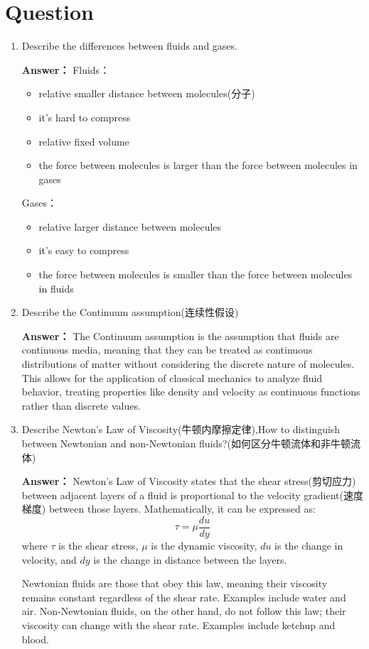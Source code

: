 \documentclass[12pt,a4paper]{article}
\newcounter{question}
\newenvironment{questions}{
    \setcounter{question}{0}
    \section*{Question}
    \begin{enumerate}[leftmargin=1.5em,label={\arabic*．}]
}{
    \end{enumerate}
}
\newcommand{\answer}[1]{\par\noindent\textbf{Answer：} #1\par\vspace{1em}}
\begin{document}
\begin{questions}
  \item Describe the differences between fluids and gases.
  \answer{
    Fluids：
    \begin{itemize}
      \item relative smaller distance between molecules(分子)
      \item it's hard to compress
      \item relative fixed volume
      \item the force between molecules is larger than the force between molecules in gases
    \end{itemize}

    Gases：
    \begin{itemize}
      \item relative larger distance between molecules
      \item it's easy to compress
      \item the force between molecules is smaller than the force between molecules in fluids
    \end{itemize}
  }

  \item Describe the Continuum assumption(连续性假设)
  
  \answer{
    The Continuum assumption is the assumption that fluids are continuous media, meaning that they can be treated as continuous distributions of matter without considering the discrete nature of molecules. This allows for the application of classical mechanics to analyze fluid behavior, treating properties like density and velocity as continuous functions rather than discrete values.
  }

  \item Describe Newton's Law of Viscosity(牛顿内摩擦定律),How to distinguish between Newtonian and non-Newtonian fluids?(如何区分牛顿流体和非牛顿流体)
  
  \answer{
    Newton's Law of Viscosity states that the shear stress(剪切应力) between adjacent layers of a fluid is proportional to the velocity gradient(速度梯度) between those layers. Mathematically, it can be expressed as:
    \[
    \tau = \mu \frac{du}{dy}
    \]
    where $\tau$ is the shear stress, $\mu$ is the dynamic viscosity, $du$ is the change in velocity, and $dy$ is the change in distance between the layers.

    Newtonian fluids are those that obey this law, meaning their viscosity remains constant regardless of the shear rate. Examples include water and air. Non-Newtonian fluids, on the other hand, do not follow this law; their viscosity can change with the shear rate. Examples include ketchup and blood.
  }


\end{questions}
\end{document}
